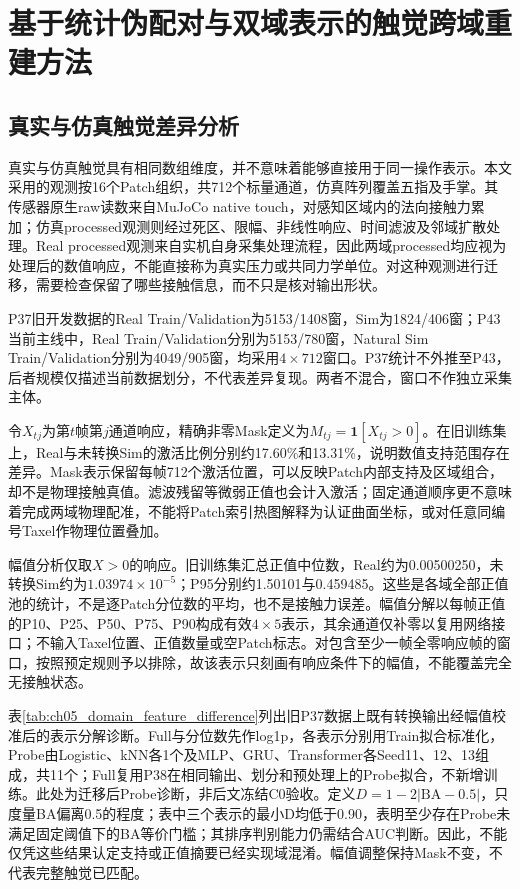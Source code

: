 \chapter{基于统计伪配对与双域表示的触觉跨域重建方法}
\label{chap:dual_domain_reconstruction}


\section{真实与仿真触觉差异分析}
\label{sec:ch05_real_sim_difference}

真实与仿真触觉具有相同数组维度，并不意味着能够直接用于同一操作表示。本文采用的观测按16个Patch组织，共712个标量通道，仿真阵列覆盖五指及手掌。其传感器原生raw读数来自MuJoCo native touch，对感知区域内的法向接触力累加\cite{mujoco2026xml}；仿真processed观测则经过死区、限幅、非线性响应、时间滤波及邻域扩散处理。Real processed观测来自实机自身采集处理流程，因此两域processed均应视为处理后的数值响应，不能直接称为真实压力或共同力学单位。对这种观测进行迁移，需要检查保留了哪些接触信息，而不只是核对输出形状。

P37旧开发数据的Real Train/Validation为5153/1408窗，Sim为1824/406窗；P43当前主线中，Real Train/Validation分别为5153/780窗，Natural Sim Train/Validation分别为4049/905窗，均采用$4\times712$窗口。P37统计不外推至P43，后者规模仅描述当前数据划分，不代表差异复现。两者不混合，窗口不作独立采集主体。

令$X_{tj}$为第$t$帧第$j$通道响应，精确非零Mask定义为$M_{tj}=\mathbf1[X_{tj}>0]$。在旧训练集上，Real与未转换Sim的激活比例分别约17.60\%和13.31\%，说明数值支持范围存在差异。Mask表示保留每帧712个激活位置，可以反映Patch内部支持及区域组合，却不是物理接触真值。滤波残留等微弱正值也会计入激活；固定通道顺序更不意味着完成两域物理配准，不能将Patch索引热图解释为认证曲面坐标，或对任意同编号Taxel作物理位置叠加。

幅值分析仅取$X>0$的响应。旧训练集汇总正值中位数，Real约为0.00500250，未转换Sim约为$1.03974\times10^{-5}$；P95分别约1.50101与0.459485。这些是各域全部正值池的统计，不是逐Patch分位数的平均，也不是接触力误差。幅值分解以每帧正值的P10、P25、P50、P75、P90构成有效$4\times5$表示，其余通道仅补零以复用网络接口；不输入Taxel位置、正值数量或空Patch标志。对包含至少一帧全零响应帧的窗口，按照预定规则予以排除，故该表示只刻画有响应条件下的幅值，不能覆盖完全无接触状态。

表\ref{tab:ch05_domain_feature_difference}列出旧P37数据上既有转换输出经幅值校准后的表示分解诊断。Full与分位数先作log1p，各表示分别用Train拟合标准化，Probe由Logistic、kNN各1个及MLP、GRU、Transformer各Seed11、12、13组成，共11个；Full复用P38在相同输出、划分和预处理上的Probe拟合，不新增训练。此处为迁移后Probe诊断，非后文冻结C0验收。定义$D=1-2|\mathrm{BA}-0.5|$，只度量BA偏离0.5的程度；表中三个表示的最小D均低于0.90，表明至少存在Probe未满足固定阈值下的BA等价门槛；其排序判别能力仍需结合AUC判断。因此，不能仅凭这些结果认定支持或正值摘要已经实现域混淆。幅值调整保持Mask不变，不代表完整触觉已匹配。

